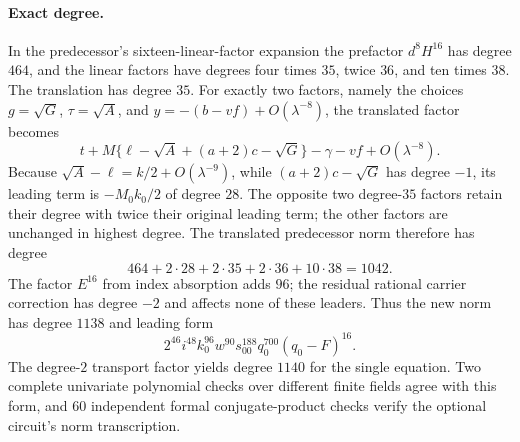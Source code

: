 \paragraph{Exact degree.}
In the predecessor's sixteen-linear-factor expansion the prefactor
$d^8H^{16}$ has degree $464$, and the linear factors have degrees
four times $35$, twice $36$, and ten times $38$. The translation has degree
$35$. For exactly two factors, namely the choices
$g=\sqrt G$, $\tau=\sqrt A$, and $y=-(b-vf)+O(\lambda^{-8})$,
the translated factor becomes
\[
 t+M\{\ell-\sqrt A+(a+2)c-\sqrt G\}-\gamma-vf
    +O(\lambda^{-8}).
\]
Because $\sqrt A-\ell=k/2+O(\lambda^{-9})$, while
$(a+2)c-\sqrt G$ has degree $-1$, its leading term is $-M_0k_0/2$
of degree $28$. The opposite two degree-$35$ factors retain their degree
with twice their original leading term; the other factors are unchanged
in highest degree. The translated predecessor norm therefore has degree
\[
 464+2\cdot28+2\cdot35+2\cdot36+10\cdot38=1042.
\]
The factor $E^{16}$ from index absorption adds $96$; the residual rational
carrier correction has degree $-2$ and affects none of these leaders.
Thus the new norm has degree $1138$ and leading form
\[
 2^{46}i^{48}k_0^{96}w^{90}s_{00}^{188}
 q_0^{700}(q_0-F)^{16}.
\]
The degree-$2$ transport factor yields degree $1140$ for the single equation.
Two complete univariate polynomial checks over different finite fields agree
with this form, and $60$ independent formal conjugate-product checks verify
the optional circuit's norm transcription.
